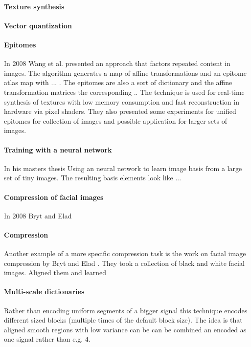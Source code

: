 \paragraph{Texture synthesis}\cite{Peyre2008}

\paragraph{Vector quantization}

\paragraph{Epitomes} In 2008 Wang et al.\cite{Wang2008a} presented
an approach that factors repeated content in images. The algorithm generates 
a map of affine transformations and an epitome atlas map with ... . The
epitomes are also a sort of dictionary and the affine transformation matrices
the corresponding .. The technique is used for real-time synthesis of textures
with low memory consumption and  fast reconstruction in hardware via pixel
shaders. They also presented some experiments for unified epitomes for
collection of images and possible application for larger sets of images. 

\paragraph{Training with a neural network} In his masters thesis 
\cite{Krizhevsky2009}
Using an neural network to learn image basis from a large set of tiny images.
The resulting basis elements look like ...

\paragraph{Compression of facial images}
In 2008 Bryt and Elad \cite{Bryt2008} 
\paragraph{Compression} \cite{Lewicki1999,Murray2006}  
Another example of a more specific compression task is the
work on facial image compression by Bryt and Elad \cite{Bryt2008}. 
They took a collection of black and white facial images. Aligned them and
learned  

\paragraph{Multi-scale dictionaries}
Rather than encoding uniform segments of a bigger signal this technique
encodes different sized blocks (multiple times of the default block size). The
idea is that aligned smooth regions with low variance can be can be combined an
encoded as one signal rather than e.g. 4. \cite{saprioSlides}\cite{Mairal2007}

